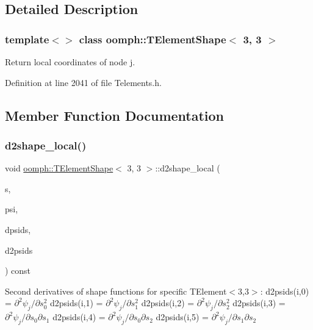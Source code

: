 \subsection{Detailed Description}
\subsubsection*{template$<$$>$\newline
class oomph\+::\+T\+Element\+Shape$<$ 3, 3 $>$}

Return local coordinates of node j. 

Definition at line 2041 of file Telements.\+h.



\subsection{Member Function Documentation}
\mbox{\label{classoomph_1_1TElementShape_3_013_00_013_01_4_ac40cce78503b5d721f54537fc701898e}} 
\subsubsection{\texorpdfstring{d2shape\+\_\+local()}{d2shape\_local()}}
{\footnotesize\ttfamily void \hyperlink{classoomph_1_1TElementShape}{oomph\+::\+T\+Element\+Shape}$<$ 3, 3 $>$\+::d2shape\+\_\+local (\begin{DoxyParamCaption}\item[{const \hyperlink{classoomph_1_1Vector}{Vector}$<$ double $>$ \&}]{s,  }\item[{\hyperlink{classoomph_1_1Shape}{Shape} \&}]{psi,  }\item[{\hyperlink{classoomph_1_1DShape}{D\+Shape} \&}]{dpsids,  }\item[{\hyperlink{classoomph_1_1DShape}{D\+Shape} \&}]{d2psids }\end{DoxyParamCaption}) const\hspace{0.3cm}{\ttfamily [inline]}}

Second derivatives of shape functions for specific T\+Element$<$3,3$>$\+: d2psids(i,0) = $ \partial^2 \psi_j / \partial s_0^2 $ d2psids(i,1) = $ \partial^2 \psi_j / \partial s_1^2 $ d2psids(i,2) = $ \partial^2 \psi_j / \partial s_2^2 $ d2psids(i,3) = $ \partial^2 \psi_j / \partial s_0 \partial s_1 $ d2psids(i,4) = $ \partial^2 \psi_j / \partial s_0 \partial s_2 $ d2psids(i,5) = $ \partial^2 \psi_j / \partial s_1 \partial s_2 $ 

